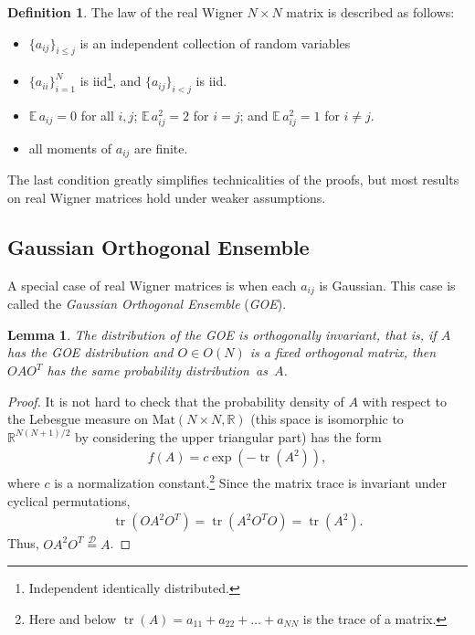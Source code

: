 \documentclass[letterpaper,11pt,oneside,reqno]{amsart}
\numberwithin{equation}{section}
\newtheorem{lemma}[proposition]{Lemma}
\theoremstyle{definition}
\newtheorem{definition}[proposition]{Definition}
\begin{document}
\begin{definition}\label{def:real_Wigner}
The law of the real Wigner $N\times N$ matrix is described as follows:
\begin{itemize}
	\item $\{a_{ij}\}_{i\leq j}$ is an independent collection of random variables
	\item $\{a_{ii}\}_{i=1}^N$ is iid\footnote{Independent identically
	distributed.}, and $\{a_{ij}\}_{i<j}$ is iid.
	\item $\mathbb E\, a_{ij}=0$ for all $i,j$; $\mathbb E\, a_{ij}^2=2$ for $i=j$; and $\mathbb E\, a_{ij}^2=1$ for $i\neq j$.
	\item all moments of $a_{ij}$ are finite.
\end{itemize}
The last condition greatly simplifies technicalities of the proofs,
but most results on real Wigner matrices hold under weaker assumptions.
\end{definition}


\subsection{Gaussian Orthogonal Ensemble} %
\label{sub:gaussian_orthogonal_ensemble}

A special case of real Wigner matrices  is when each $a_{ij}$ is Gaussian.
This case is called the \emph{Gaussian Orthogonal Ensemble} (\emph{GOE}).

\begin{lemma}
	The distribution of the GOE is orthogonally invariant, that is,
	if $A$ has the GOE distribution and $O\in O(N)$ is a fixed
	orthogonal matrix, then $OAO^{T}$ has the same probability distribution~as~$A$.
\end{lemma}
\begin{proof}
	It is not hard to check that the
	probability density of $A$ with respect to the 
	Lebesgue measure on $\mathrm{Mat}(N\times N,\mathbb R)$
	(this space is isomorphic to $\mathbb{R}^{N(N+1)/2}$
	by considering the upper triangular part)
	has the form
	\begin{align*}
		f(A)=c \exp(-\mathop{\mathrm{tr}}(A^2)),
	\end{align*}
	where $c$ is a normalization constant.\footnote{Here 
	and below $\mathop{\mathrm{tr}}(A)=a_{11}+a_{22}+\ldots+a_{NN}$ 
	is the trace of a matrix.}  Since the matrix trace
	is invariant under cyclical permutations, 
	\begin{align*}
		\mathop{\mathrm{tr}}(OA^2O^{T})
		=\mathop{\mathrm{tr}}(A^2O^{T}O)
		=\mathop{\mathrm{tr}}(A^2).
	\end{align*}
	Thus, $OA^2O^{T}\stackrel{\mathcal D}{=} A$.
\end{proof}
\end{document}
